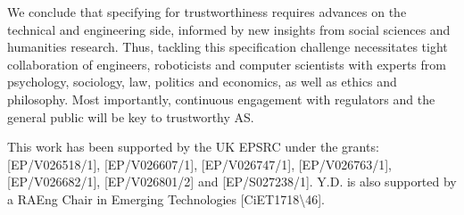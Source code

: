 \documentclass[sigconf,nonacm]{acmart}%
\begin{document}
	We conclude that specifying for trustworthiness requires advances on the technical and engineering side, informed by new insights from social sciences and humanities research. Thus, tackling this specification challenge necessitates tight collaboration of engineers, roboticists and computer scientists with experts from psychology, sociology, law, politics and economics, as well as ethics and philosophy. Most importantly, continuous engagement with regulators and the general public will be key to trustworthy AS.
	
	\vspace{-3.6pt}
	\begin{acks}
		This work has been supported by the UK EPSRC under the grants: [EP/V026518/1], [EP/V026607/1], [EP/V026747/1], [EP/V026763/1], [EP/V026682/1], [EP/V026801/2] and [EP/S027238/1]. Y.D. is also supported by a RAEng Chair in Emerging Technologies [CiET1718\textbackslash46].
	\end{acks}
	
	
	
\end{document}
